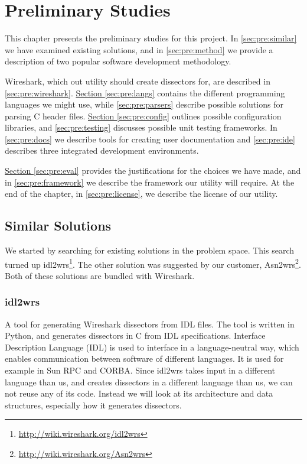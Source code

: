 \chapter{Preliminary Studies}
This chapter presents the preliminary studies for this project.
In \autoref{sec:pre:similar} we have examined existing solutions, and in
\autoref{sec:pre:method} we provide a description of two popular software
development methodology.

Wireshark, which out utility should create dissectors for, are described in
\autoref{sec:pre:wireshark}.
\hyperref[sec:pre:langs]{Section \ref*{sec:pre:langs}} contains the different
programming languages we might use, while \autoref{sec:pre:parsers}
describe possible solutions for parsing C header files.
\hyperref[sec:pre:config]{Section \ref*{sec:pre:config}} outlines possible
configuration libraries, and \autoref{sec:pre:testing} discusses possible unit
testing frameworks. In \autoref{sec:pre:docs} we describe tools for creating
user documentation and \autoref{sec:pre:ide} describes three integrated
development environments.

\hyperref[sec:pre:eval]{Section \ref*{sec:pre:eval}} provides the
justifications for the choices we have made, and in
\autoref{sec:pre:framework} we describe the framework our utility will require.
At the end of the chapter, in \autoref{sec:pre:license}, we describe the
license of our utility.


\section{Similar Solutions}
\label{sec:pre:similar}
We started by searching for existing solutions in the problem space. This
search turned up idl2wrs\footnote{\url{http://wiki.wireshark.org/idl2wrs}}.
The other solution was suggested by our customer,
Asn2wrs\footnote{\url{http://wiki.wireshark.org/Asn2wrs}}.
Both of these solutions are bundled with Wireshark.

\subsection{idl2wrs}
A tool for generating Wireshark dissectors from IDL files. The tool is written
in Python, and generates dissectors in C from IDL specifications. Interface
Description Language (IDL) is used to interface in a language-neutral way,
which enables communication between software of different languages. It is
used for example in Sun RPC and CORBA. Since idl2wrs takes input in a different
language than us, and creates dissectors in a different language than us, we
can not reuse any of its code. Instead we will look at its architecture and
data structures, especially how it generates dissectors.

